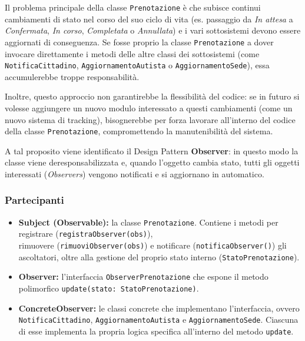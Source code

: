 Il problema principale della classe \texttt{Prenotazione} è che subisce continui cambiamenti di stato nel corso del suo ciclo di vita (es. passaggio da \textit{In attesa} a \textit{Confermata}, \textit{In corso}, \textit{Completata} o \textit{Annullata}) e i vari sottosistemi devono essere aggiornati di conseguenza. Se fosse proprio la classe \texttt{Prenotazione} a dover invocare direttamente i metodi delle altre classi dei sottosistemi (come \texttt{NotificaCittadino}, \texttt{AggiornamentoAutista} o \texttt{AggiornamentoSede}), essa accumulerebbe troppe responsabilità.

Inoltre, questo approccio non garantirebbe la flessibilità del codice: se in futuro si volesse aggiungere un nuovo modulo interessato a questi cambiamenti (come un nuovo sistema di tracking), bisognerebbe per forza lavorare all'interno del codice della classe \texttt{Prenotazione}, compromettendo la manutenibilità del sistema.

A tal proposito viene identificato il Design Pattern \textbf{Observer}: in questo modo la classe viene deresponsabilizzata e, quando l'oggetto cambia stato, tutti gli oggetti interessati (\textit{Observers}) vengono notificati e si aggiornano in automatico.

\subsubsection{Partecipanti}

\begin{itemize}[leftmargin=*]
    \item \textbf{Subject (Observable):} la classe \texttt{Prenotazione}. Contiene i metodi per registrare (\texttt{registraObserver(obs)}),\\rimuovere (\texttt{rimuoviObserver(obs)}) e notificare (\texttt{notificaObserver()}) gli ascoltatori, oltre alla gestione del proprio stato interno (\texttt{StatoPrenotazione}).
    \item \textbf{Observer:} l'interfaccia \texttt{ObserverPrenotazione} che espone il metodo polimorfico \texttt{update(stato: StatoPrenotazione)}.
    \item \textbf{ConcreteObserver:} le classi concrete che implementano l'interfaccia, ovvero\\ \texttt{NotificaCittadino}, \texttt{AggiornamentoAutista} e \texttt{AggiornamentoSede}. Ciascuna di esse implementa la propria logica specifica all'interno del metodo \texttt{update}.
\end{itemize}

